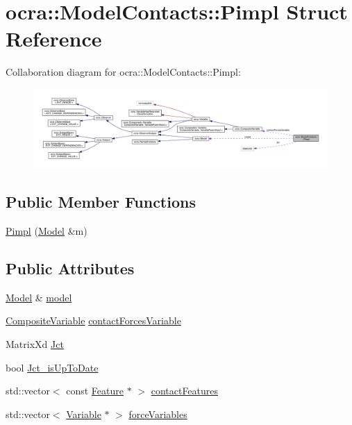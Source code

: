 \hypertarget{structocra_1_1ModelContacts_1_1Pimpl}{}\section{ocra\+:\+:Model\+Contacts\+:\+:Pimpl Struct Reference}
\label{structocra_1_1ModelContacts_1_1Pimpl}


Collaboration diagram for ocra\+:\+:Model\+Contacts\+:\+:Pimpl\+:
\nopagebreak
\begin{figure}[H]
\begin{center}
\leavevmode
\includegraphics[width=350pt]{d9/d86/structocra_1_1ModelContacts_1_1Pimpl__coll__graph}
\end{center}
\end{figure}
\subsection*{Public Member Functions}
\begin{DoxyCompactItemize}
\item 
\hyperlink{structocra_1_1ModelContacts_1_1Pimpl_a49e42d553f4cb66b8c6207e63733d410}{Pimpl} (\hyperlink{classocra_1_1Model}{Model} \&m)
\end{DoxyCompactItemize}
\subsection*{Public Attributes}
\begin{DoxyCompactItemize}
\item 
\hyperlink{classocra_1_1Model}{Model} \& \hyperlink{structocra_1_1ModelContacts_1_1Pimpl_a16998d1fe02ccbb3a3f2282d5ddc5074}{model}
\item 
\hyperlink{classocra_1_1CompositeVariable}{Composite\+Variable} \hyperlink{structocra_1_1ModelContacts_1_1Pimpl_a274e86267cd0b9dba8105fda27fda205}{contact\+Forces\+Variable}
\item 
Matrix\+Xd \hyperlink{structocra_1_1ModelContacts_1_1Pimpl_ae11aa9cbd6a04aebd3039556c3da027b}{Jct}
\item 
bool \hyperlink{structocra_1_1ModelContacts_1_1Pimpl_ac0fa66cfb8b54718dd3a03c683819c6d}{Jct\+\_\+is\+Up\+To\+Date}
\item 
std\+::vector$<$ const \hyperlink{classocra_1_1Feature}{Feature} $\ast$ $>$ \hyperlink{structocra_1_1ModelContacts_1_1Pimpl_ac15c6469b805fa54ffb5422a7b1014bd}{contact\+Features}
\item 
std\+::vector$<$ \hyperlink{classocra_1_1Variable}{Variable} $\ast$ $>$ \hyperlink{structocra_1_1ModelContacts_1_1Pimpl_a133837a5c20241ac20b41c0fb7401682}{force\+Variables}
\end{DoxyCompactItemize}


